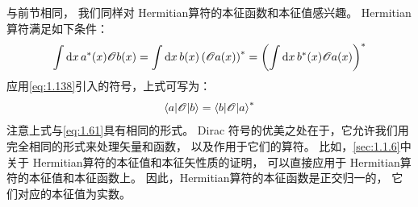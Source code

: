 与前节相同，
我们同样对 Hermitian算符的本征函数和本征值感兴趣。
Hermitian算符满足如下条件：
\begin{equation}
 \int\mathrm{d}x\,a^\ast(x)\mathscr{O}b(x) = \int\mathrm{d}x\,b(x)\left(\mathscr{O}a(x)\right)^\ast = \left(\int\mathrm{d}x\,b^\ast(x)\mathscr{O}a(x)\right)^\ast
 \label{eq:1.139}
\end{equation}
应用\autoref{eq:1.138}引入的符号，上式可写为：
\begin{equation}
 \left\langle a\middle\vert \mathscr{O} \middle\vert b\right\rangle = {\left\langle b\middle\vert \mathscr{O} \middle\vert a\right\rangle}^\ast
 \label{eq:1.140}
\end{equation}
注意上式与\autoref{eq:1.61}具有相同的形式。
Dirac 符号的优美之处在于，它允许我们用完全相同的形式来处理矢量和函数，
以及作用于它们的算符。
比如，\autoref{sec:1.1.6}中关于 Hermitian算符的本征值和本征矢性质的证明，
可以直接应用于 Hermitian算符的本征值和本征函数上。
因此，Hermitian算符的本征函数是正交归一的，
它们对应的本征值为实数。


